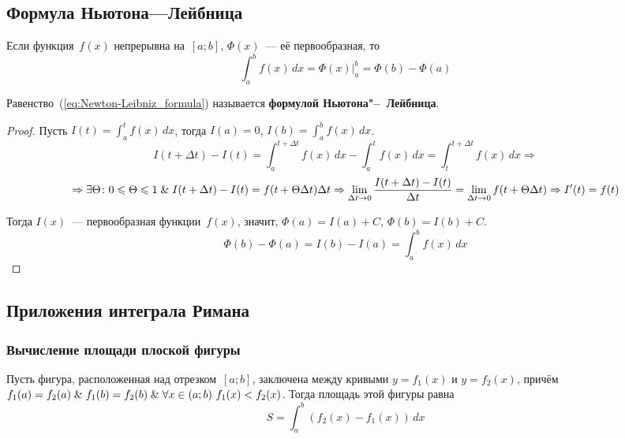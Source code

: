 \subsection{Формула Ньютона---Лейбница}
\begin{theorem}
Если функция~$f(x)$ непрерывна на~$[a; b]$, $\Phi(x)$~--- её первообразная, то
\begin{equation}
\label{eq:Newton-Leibniz_formula}
\int_a^b f(x)\,dx = \left. \Phi(x) \right|_a^b = \Phi(b) - \Phi(a)
\end{equation}
\end{theorem}
 Равенство~(\ref{eq:Newton-Leibniz_formula}) называется \textbf{формулой Ньютона"--~Лейбница}.
\begin{proof}
Пусть $\displaystyle I(t) = \int_a^t f(x)\,dx$, тогда $I(a) = 0$, $\displaystyle I(b) = \int_a^b f(x)\,dx$.
\begin{equation*}
I(t + \Delta t) - I(t) =
\int_a^{t+\Delta t} f(x)\,dx - \int_a^t f(x)\,dx =
\int_t^{t + \Delta t} f(x)\,dx \Rightarrow
\end{equation*}
\begin{equation*}
\Rightarrow \exists \Theta \colon 0 \leqslant \Theta \leqslant 1 \mathrel{\&} I(t + \Delta t) - I(t) = f(t + \Theta \Delta t) \Delta t \Rightarrow
\lim_{\Delta t \to 0} \frac{I(t + \Delta t) - I(t)}{\Delta t} = \lim_{\Delta t \to 0} f(t + \Theta \Delta t) \Rightarrow
I'(t) = f(t)
\end{equation*}

Тогда $I(x)$~--- первообразная функции~$f(x)$, значит, $\Phi(a) = I(a) + C$, $\Phi(b) = I(b) + C$.
\begin{equation*}
\Phi(b) - \Phi(a) = I(b) - I(a) = \int_a^b f(x)\,dx
\end{equation*}
\end{proof}

\subsection{Приложения интеграла Римана}
\subsubsection{Вычисление площади плоской фигуры}
Пусть фигура, расположенная над отрезком~$[a; b]$, заключена между кривыми $y = f_1(x)$ и $y = f_2(x)$, причём $f_1(a) = f_2(a) \mathrel{\&} f_1(b) = f_2(b) \mathrel{\&} \forall x \in (a; b) \ f_1(x) < f_2(x)$.
Тогда площадь этой фигуры равна
\begin{equation*}
S = \int_a^b (f_2(x) - f_1(x))\,dx
\end{equation*}

